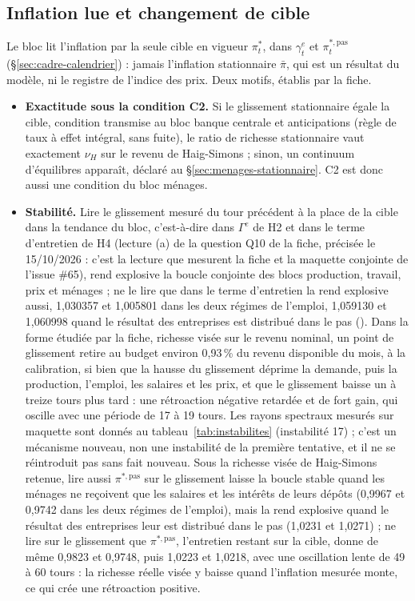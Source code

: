 \documentclass[11pt,a4paper]{article}
\newcommand{\code}[1]{\texttt{\detokenize{#1}}}
\begin{document}
\subsection{Inflation lue et changement de cible}
\label{sec:menages-inflation}
\begin{proposee}
Le bloc lit l'inflation par la seule cible en vigueur $\pi^\ast_t$, dans $\gamma^e_t$ et $\pi^{\ast,\mathrm{pas}}_t$ (\S\ref{sec:cadre-calendrier}) : jamais l'inflation stationnaire $\bar\pi$, qui est un résultat du modèle, ni le registre de l'indice des prix. Deux motifs, établis par la fiche.
\begin{itemize}
\item \textbf{Exactitude sous la condition C2.} Si le glissement stationnaire égale la cible, condition transmise au bloc banque centrale et anticipations (règle de taux à effet intégral, sans fuite), le ratio de richesse stationnaire vaut exactement $\nu_H$ sur le revenu de Haig-Simons ; sinon, un continuum d'équilibres apparaît, déclaré au \S\ref{sec:menages-stationnaire}. C2 est donc aussi une condition du bloc ménages.
\item \textbf{Stabilité.} Lire le glissement mesuré du tour précédent à la place de la cible dans la tendance du bloc, c'est-à-dire dans $\Gamma^e$ de H2 et dans le terme d'entretien de H4 (lecture (a) de la question Q10 de la fiche, précisée le 15/10/2026 : c'est la lecture que mesurent la fiche et la maquette conjointe de l'issue \#65), rend explosive la boucle conjointe des blocs production, travail, prix et ménages ; ne le lire que dans le terme d'entretien la rend explosive aussi, 1,030357 et 1,005801 dans les deux régimes de l'emploi, 1,059130 et 1,060998 quand le résultat des entreprises est distribué dans le pas (\code{outils/maquette_conjointe.py}). Dans la forme étudiée par la fiche, richesse visée sur le revenu nominal, un point de glissement retire au budget environ 0,93\,\% du revenu disponible du mois, à la calibration, si bien que la hausse du glissement déprime la demande, puis la production, l'emploi, les salaires et les prix, et que le glissement baisse un à treize tours plus tard : une rétroaction négative retardée et de fort gain, qui oscille avec une période de 17 à 19 tours. Les rayons spectraux mesurés sur maquette sont donnés au tableau~\ref{tab:instabilites} (instabilité 17) ; c'est un mécanisme nouveau, non une instabilité de la première tentative, et il ne se réintroduit pas sans fait nouveau. Sous la richesse visée de Haig-Simons retenue, lire aussi $\pi^{\ast,\mathrm{pas}}$ sur le glissement laisse la boucle stable quand les ménages ne reçoivent que les salaires et les intérêts de leurs dépôts (0,9967 et 0,9742 dans les deux régimes de l'emploi), mais la rend explosive quand le résultat des entreprises leur est distribué dans le pas (1,0231 et 1,0271) ; ne lire sur le glissement que $\pi^{\ast,\mathrm{pas}}$, l'entretien restant sur la cible, donne de même 0,9823 et 0,9748, puis 1,0223 et 1,0218, avec une oscillation lente de 49 à 60 tours : la richesse réelle visée y baisse quand l'inflation mesurée monte, ce qui crée une rétroaction positive.

\end{itemize}
\end{proposee}
\end{document}
